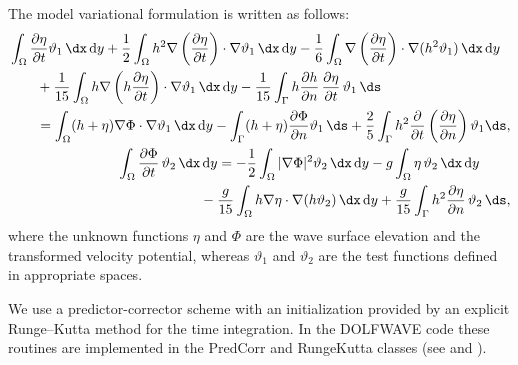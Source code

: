 The model variational formulation is written as follows:
\begin{subequations}
  \label{eq:lopes:varform}
  \begin{align}
    \begin{split}
      &\displaystyle \int_\Omega\frac{\partial \eta}{\partial
        t}\vartheta_1\, \dx\, \mathrm{d}y +\frac{1}{2}\int_\Omega
      h^2\nabla\left(\frac{\partial \eta}{\partial t}\right)
      \cdot\nabla\vartheta_1\, \dx\, \mathrm{d}y-
      \frac{1}{6}\int_\Omega \nabla\left(\frac{\partial \eta}{\partial
          t}\right)\cdot\nabla(h^2\vartheta_1)\, \dx\, \mathrm{d}y\\
      &\quad \quad\displaystyle +
      \frac{1}{15}\int_\Omega
      h\nabla\left(h\frac{\partial \eta}{\partial t}\right)\cdot
      \nabla\vartheta_1\, \dx\, \mathrm{d}y- \frac{1}{15}\int_\Gamma
      h\frac{\partial h}{\partial n}\,\frac{\partial \eta}{\partial
        t}\,\vartheta_1\, \ds
      \\ &\quad\quad=\displaystyle
      \int_\Omega(h+\eta)\nabla\Phi\cdot\nabla\vartheta_1\,
      \dx\, \mathrm{d}y -\int_\Gamma(h+\eta)\frac{\partial
        \Phi}{\partial n}\vartheta_1\, \ds
      +\frac{2}{5}\int_\Gamma
      h^2\frac{\partial }{\partial t}\left(\frac{\partial
          \eta}{\partial n}\right)\vartheta_1 \ds,
      \vspace{0.3cm}
    \end{split} \\
    \begin{split}
      &\displaystyle \int_\Omega \frac{\partial \Phi}{\partial
        t}\,\vartheta_2\, \dx\, \mathrm{d}y=
      -\frac{1}{2}\int_\Omega|\nabla\Phi|^2\vartheta_2\, \dx\,
      \mathrm{d}y -g\int_\Omega \eta\,\vartheta_2\, \dx\,
      \mathrm{d}y\\
      &\qquad\qquad\qquad\displaystyle-\frac{g}{15}\int_\Omega
      h\nabla\eta\cdot\nabla(h\vartheta_2)\, \dx\, \mathrm{d}y
      +\frac{g}{15}\int_\Gamma h^2\frac{\partial \eta}{\partial
        n}\,\vartheta_2\, \ds,
    \end{split}
  \end{align}
\end{subequations}
where the unknown functions $\eta$ and $\Phi$ are the wave surface
elevation and the transformed velocity potential, whereas
$\vartheta_1$ and $\vartheta_2$ are the test functions defined in
appropriate spaces.

We use a predictor-corrector  scheme with
an initialization provided by an explicit
Runge--Kutta method for the time integration. In
the DOLFWAVE code these routines are implemented in the PredCorr and
RungeKutta classes (see  and
).

